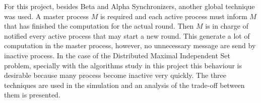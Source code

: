 For this project, besides Beta and Alpha Synchronizers, another global technique was used. A master process $M$ is required and each active process must inform $M$ that has finished the computation for the actual round. Then $M$ is in charge of notified every active process that may start a new round. This generate a lot of computation in the master process, however, no unnecessary message are send by inactive process. In the case of the Distributed Maximal Independent Set problem, specially with the algorithms study in this project this behaviour is desirable because many process become inactive very quickly. The three techniques are used in the simulation and an analysis of the trade-off between them is presented.

\newpage



